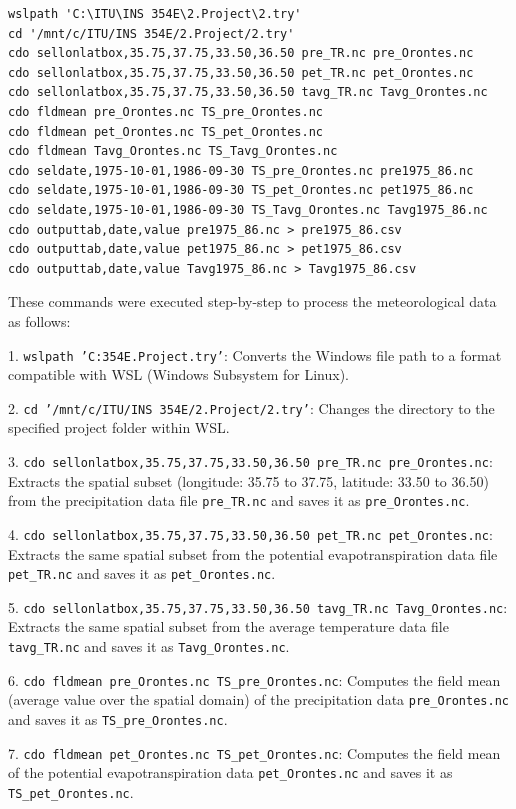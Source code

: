 \documentclass[a4paper, 12pt]{article}
\begin{document}
\begin{lstlisting}
wslpath 'C:\ITU\INS 354E\2.Project\2.try'
cd '/mnt/c/ITU/INS 354E/2.Project/2.try'
cdo sellonlatbox,35.75,37.75,33.50,36.50 pre_TR.nc pre_Orontes.nc
cdo sellonlatbox,35.75,37.75,33.50,36.50 pet_TR.nc pet_Orontes.nc
cdo sellonlatbox,35.75,37.75,33.50,36.50 tavg_TR.nc Tavg_Orontes.nc
cdo fldmean pre_Orontes.nc TS_pre_Orontes.nc
cdo fldmean pet_Orontes.nc TS_pet_Orontes.nc
cdo fldmean Tavg_Orontes.nc TS_Tavg_Orontes.nc 
cdo seldate,1975-10-01,1986-09-30 TS_pre_Orontes.nc pre1975_86.nc
cdo seldate,1975-10-01,1986-09-30 TS_pet_Orontes.nc pet1975_86.nc
cdo seldate,1975-10-01,1986-09-30 TS_Tavg_Orontes.nc Tavg1975_86.nc
cdo outputtab,date,value pre1975_86.nc > pre1975_86.csv
cdo outputtab,date,value pet1975_86.nc > pet1975_86.csv
cdo outputtab,date,value Tavg1975_86.nc > Tavg1975_86.csv
\end{lstlisting}

These commands were executed step-by-step to process the meteorological data as follows:

1. \texttt{wslpath 'C:\ITU\INS 354E\2.Project\2.try'}: Converts the Windows file path to a format compatible with WSL (Windows Subsystem for Linux).

2. \texttt{cd '/mnt/c/ITU/INS 354E/2.Project/2.try'}: Changes the directory to the specified project folder within WSL.

3. \texttt{cdo sellonlatbox,35.75,37.75,33.50,36.50 pre\_TR.nc pre\_Orontes.nc}: Extracts the spatial subset (longitude: 35.75 to 37.75, latitude: 33.50 to 36.50) from the precipitation data file \texttt{pre\_TR.nc} and saves it as \texttt{pre\_Orontes.nc}.

4. \texttt{cdo sellonlatbox,35.75,37.75,33.50,36.50 pet\_TR.nc pet\_Orontes.nc}: Extracts the same spatial subset from the potential evapotranspiration data file \texttt{pet\_TR.nc} and saves it as \texttt{pet\_Orontes.nc}.

5. \texttt{cdo sellonlatbox,35.75,37.75,33.50,36.50 tavg\_TR.nc Tavg\_Orontes.nc}: Extracts the same spatial subset from the average temperature data file \texttt{tavg\_TR.nc} and saves it as \texttt{Tavg\_Orontes.nc}.

6. \texttt{cdo fldmean pre\_Orontes.nc TS\_pre\_Orontes.nc}: Computes the field mean (average value over the spatial domain) of the precipitation data \texttt{pre\_Orontes.nc} and saves it as \texttt{TS\_pre\_Orontes.nc}.

7. \texttt{cdo fldmean pet\_Orontes.nc TS\_pet\_Orontes.nc}: Computes the field mean of the potential evapotranspiration data \texttt{pet\_Orontes.nc} and saves it as \texttt{TS\_pet\_Orontes.nc}.
\end{document}
